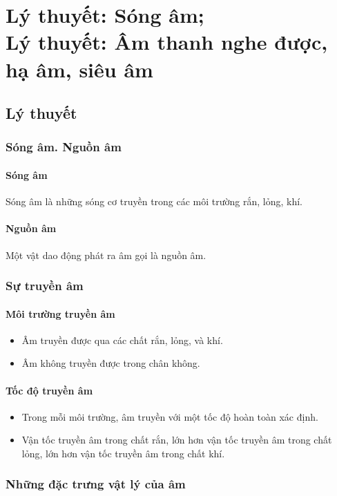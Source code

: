 
\chapter[Lý thuyết: Sóng âm;\\
Lý thuyết: Âm thanh nghe được, hạ âm, siêu âm]{Lý thuyết: Sóng âm;\\Lý thuyết: Âm thanh nghe được, hạ âm, siêu âm}
\section{Lý thuyết}
\subsection{Sóng âm. Nguồn âm}
\subsubsection{Sóng âm}
Sóng âm là những sóng cơ truyền trong các môi trường rắn, lỏng, khí. 
\subsubsection{Nguồn âm}			
Một vật dao động phát ra âm gọi là nguồn âm.
\subsection{Sự truyền âm}
\subsubsection{Môi trường truyền âm}
\begin{itemize}
	\item Âm truyền được qua các chất rắn, lỏng, và khí.
	\item Âm không truyền được trong chân không.
\end{itemize}
\subsubsection{Tốc độ truyền âm}
\begin{itemize}
	\item Trong mỗi môi trường, âm truyền với một tốc độ hoàn toàn xác định.
	\item Vận tốc truyền âm trong chất rắn, lớn hơn vận tốc truyền âm trong chất lỏng, lớn hơn vận tốc truyền âm trong chất khí.
\end{itemize}
\subsection{Những đặc trưng vật lý của âm} 
